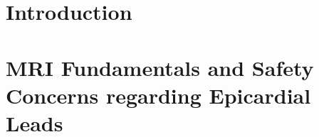\documentclass[12pt]{report}  %
\begin{document}
\newpage
\thispagestyle{empty}
\mbox{}
\clearpage %




\doublespacing

\newpage %
\thispagestyle{empty} %
\mbox{}
\clearpage 


\clearpage


\clearpage


\clearpage
{\singlespacing
	\tableofcontents
	\clearpage
	\listoftables
	\clearpage
	\listoffigures
}
\clearpage



%
\chapter {Introduction}
\label{ch:intro}


%
\chapter{MRI Fundamentals and Safety Concerns regarding Epicardial Leads }
\label{ch:background}

\end{document}
